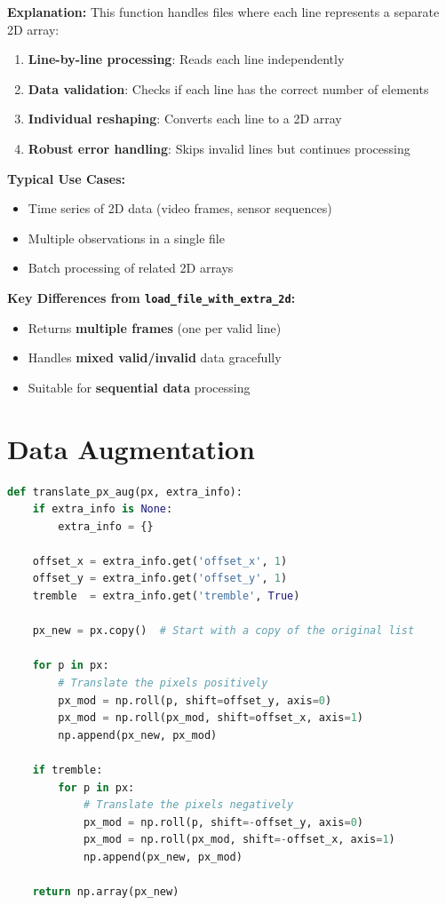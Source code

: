 \documentclass[10pt]{book}
\begin{document}
\textbf{Explanation:}
This function handles files where each line represents a separate 2D array:

\begin{enumerate}
\item \textbf{Line-by-line processing}: Reads each line independently
\item \textbf{Data validation}: Checks if each line has the correct number of elements
\item \textbf{Individual reshaping}: Converts each line to a 2D array
\item \textbf{Robust error handling}: Skips invalid lines but continues processing
\end{enumerate}

\textbf{Typical Use Cases:}
\begin{itemize}
\item Time series of 2D data (video frames, sensor sequences)
\item Multiple observations in a single file
\item Batch processing of related 2D arrays
\end{itemize}

\textbf{Key Differences from \texttt{load\_file\_with\_extra\_2d}:}
\begin{itemize}
\item Returns \textbf{multiple frames} (one per valid line)
\item Handles \textbf{mixed valid/invalid} data gracefully
\item Suitable for \textbf{sequential data} processing
\end{itemize}

\section{Data Augmentation}

\begin{lstlisting}[language=Python]
def translate_px_aug(px, extra_info):
    if extra_info is None:
        extra_info = {}

    offset_x = extra_info.get('offset_x', 1)
    offset_y = extra_info.get('offset_y', 1)
    tremble  = extra_info.get('tremble', True)
    
    px_new = px.copy()  # Start with a copy of the original list

    for p in px:
        # Translate the pixels positively
        px_mod = np.roll(p, shift=offset_y, axis=0)
        px_mod = np.roll(px_mod, shift=offset_x, axis=1)
        np.append(px_new, px_mod)

    if tremble:
        for p in px:
            # Translate the pixels negatively
            px_mod = np.roll(p, shift=-offset_y, axis=0)
            px_mod = np.roll(px_mod, shift=-offset_x, axis=1)
            np.append(px_new, px_mod)

    return np.array(px_new)
\end{lstlisting}
\end{document}

